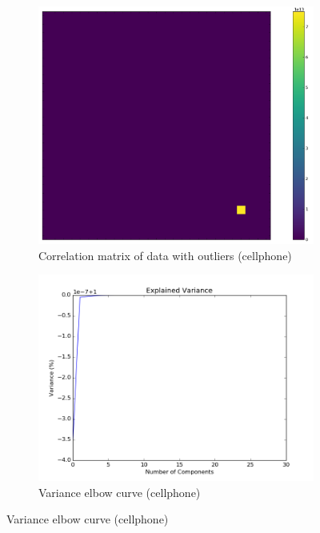 \documentclass[20pt]{article} %
\begin{document}
\begin{figure}[!htbp]
  	\centering
   	\begin{subfigure}[p]{0.4\linewidth}
    	\includegraphics[width=\linewidth]{../figures/anotherfullheatmap.png}
	\caption{Correlation matrix of data with outliers (cellphone)}
   	\end{subfigure}
   	\begin{subfigure}[p]{0.4\linewidth}
    	\includegraphics[width=\linewidth]{../figures/explained_variance.png}
	\caption{Variance elbow curve (cellphone)}
   	\end{subfigure}
\end{figure} 
\end{document}
